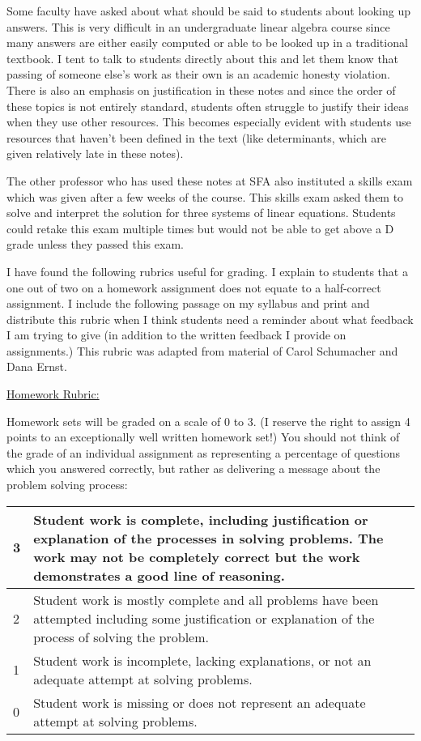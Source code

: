 \begin{annotation}
Some faculty have asked about what should be said to students about looking up answers. This is very difficult in an undergraduate linear algebra course since many answers are either easily computed or able to be looked up in a traditional textbook. I tent to talk to students directly about this and let them know that passing of someone else's work as their own is an academic honesty violation. There is also an emphasis on justification in these notes and since the order of these topics is not entirely standard, students often struggle to justify their ideas when they use other resources. This becomes especially evident with students use resources that haven't been defined in the text (like determinants, which are given relatively late in these notes).

The other professor who has used these notes at SFA also instituted a skills exam which was given after a few weeks of the course. This skills exam asked them to solve and interpret the solution for three systems of linear equations. Students could retake this exam multiple times but would not be able to get above a D grade unless they passed this exam.

I have found the following rubrics useful for grading.  I explain to students that a one out of two on a homework assignment does not equate to a half-correct assignment. I include the following passage on my syllabus and print and distribute this rubric when I think students need a reminder about what feedback I am trying to give (in addition to the written feedback I provide on assignments.) This rubric was adapted from material of Carol Schumacher and Dana Ernst.

\underline{Homework Rubric:}

Homework sets will be graded on a scale of 0 to 3. (I reserve the right to assign 4 points to an exceptionally well written homework set!) You should not think of the grade of an individual assignment as representing a percentage of questions which you answered correctly, but rather as delivering a message about the problem solving process:
\newline
\begin{tabular}{|l|p{11cm}|}
\hline
3 & Student work is complete, including justification or explanation of the processes in solving problems. The work may not be completely correct but the work demonstrates a good line of reasoning. \\
\hline
2 & Student work is mostly complete and all problems have been attempted including some justification or explanation of the process of solving the problem.\\
\hline
1 & Student work is incomplete, lacking explanations, or not an adequate attempt at solving problems. \\
\hline
0 & Student work is missing or does not represent an adequate attempt at solving problems. \\
\hline
\end{tabular}


\end{annotation}

